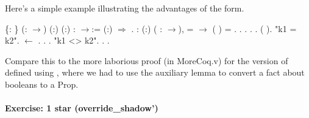 \documentclass[12pt]{report}
\begin{document}
\subsubsection{ }

 Here's a simple example illustrating the advantages of the
    form. \begin{coqdoccode}
\coqdocemptyline
\coqdocnoindent
{}  \{: \} (: \ensuremath{\rightarrow}) (:) (:) : \ensuremath{\rightarrow}:=\coqdoceol
\coqdocindent{1.00em}
 (:) \ensuremath{\Rightarrow}         .\coqdoceol
\coqdocemptyline
\coqdocnoindent
{}  : \coqdockw{\ensuremath{\forall}} (:)    ( : \ensuremath{\rightarrow}),\coqdoceol
\coqdocindent{1.00em}
  =  \ensuremath{\rightarrow} \coqdoceol
\coqdocindent{1.00em}
(   )  =  .\coqdoceol
\coqdocnoindent
{}.\coqdoceol
\coqdocindent{1.00em}
     .  .\coqdoceol
\coqdocindent{1.00em}
 .\coqdoceol
\coqdocindent{1.00em}
 (  ). \coqdocindent{1.00em}
 "k1 = k2".\coqdoceol
\coqdocindent{2.00em}
 \ensuremath{\leftarrow} .\coqdoceol
\coqdocindent{2.00em}
.  .\coqdoceol
\coqdocindent{1.00em}
 "k1 <> k2".\coqdoceol
\coqdocindent{2.00em}
. .\coqdoceol
\coqdocemptyline
\end{coqdoccode}
Compare this to the more laborious proof (in MoreCoq.v) for the
    version of  defined using , where we had to use
    the auxiliary lemma  to convert a fact about
    booleans to a Prop. 

\paragraph{Exercise: 1 star (override\_shadow')}
\end{document}
